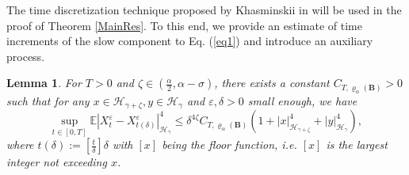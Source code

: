 \documentclass[10pt,a4paper]{article}
\newtheorem{lemma}{Lemma}[section]
\numberwithin{equation}{section}
\begin{document}
The time discretization technique proposed by Khasminskii in \cite{K68} will be used in the proof of Theorem \ref{MainRes}.
To this end, we provide an estimate of time increments of the slow component to Eq. (\ref{eq1}) and introduce an auxiliary process.





\begin{lemma}\label{Xdifflem}
	For $T>0$ and $\zeta \in (\frac \alpha2,\alpha-\sigma)$, there exists a constant $C_{T,\varrho_{\alpha}(\mathbf{B})}>0$ such that for any $x \in \mathcal{H}_{\gamma+\zeta}, y \in \mathcal H_\gamma$ and $\varepsilon, \delta >0$ small enough, we have
	$$\sup_{t \in [0,T]} \mathbb E |X_t^\varepsilon-X_{t(\delta)}^\varepsilon|_{\mathcal H_\gamma }^4
	\leq \delta^{4\zeta}  C_{T,\varrho_{\alpha}(\mathbf{B})} (1+|x|_{\mathcal H_{\gamma+\zeta} }^4+|y|_{\mathcal H_\gamma}^4),$$
	where $t(\delta):=[\frac{t}{\delta}]\delta$ with $[x]$ being the floor function, i.e. $[x]$ is the largest integer not exceeding $x$.
\end{lemma}
\end{document}
